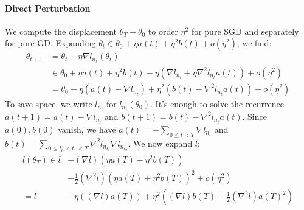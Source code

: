 \documentclass[openany, notitlepage, justified]{tufte-book}
\theoremstyle{plain}
\theoremstyle{definition}
\begin{document}
            \newpage
            \paragraph{Direct Perturbation} 
            \begin{shaded}
                We compute the displacement $\theta_T-\theta_0$ to order $\eta^2$ 
                for pure SGD and separately for pure GD.  Expanding
                $
                    \theta_t \in \theta_0 + \eta a(t) + \eta^2 b(t) + o(\eta^2)
                $, we find:
                \begin{align*}
                    \theta_{t+1} &=     \theta_t - \eta \nabla l_{n_t} (\theta_t) \\
                                 &\in       \theta_0
                                        +   \eta a(t) + \eta^2 b(t)
                                        -   \eta (
                                                    \nabla l_{n_t}
                                                +   \eta \nabla^2 l_{n_t} a(t) 
                                            )
                                        +   o(\eta^2) \\
                                 &=     \theta_0
                                    +   \eta (a(t) - \nabla l_{n_t})
                                    +   \eta^2 (b(t) - \nabla^2 l_{n_t} a(t)) 
                                    +   o(\eta^2)
                \end{align*}
                To save space, we write $l_{n_t}$ for $l_{n_t}(\theta_0)$.  It's
                enough to solve the recurrence $a(t+1) = a(t) - \nabla l_{n_t}$ and
                $b(t+1) = b(t) - \nabla^2 l_{n_t} a(t)$.  Since $a(0), b(0)$
                vanish, we have $a(t) =-\sum_{0\leq t<T} \nabla l_{n_t}$ and $b(t)
                = \sum_{0\leq t_0 < t_1 < T} \nabla^2 l_{n_{t_1}} \nabla
                l_{n_{t_0}}$.  We now expand $l$:
                \begin{align*}
                    l(\theta_T) \in    l   &+   (\nabla l) (\eta a(T) + \eta^2 b(T)) \\
                                           &+   \frac{1}{2} (\nabla^2 l) (\eta a(T) + \eta^2 b(T))^2
                                            +   o(\eta^2) \\
                                =      l   &+   \eta ((\nabla l) a(T))
                                            +   \eta^2 ((\nabla l) b(T) + \frac{1}{2} (\nabla^2 l) a(T)^2 )

\end{align*}
\end{shaded}
\end{document}
